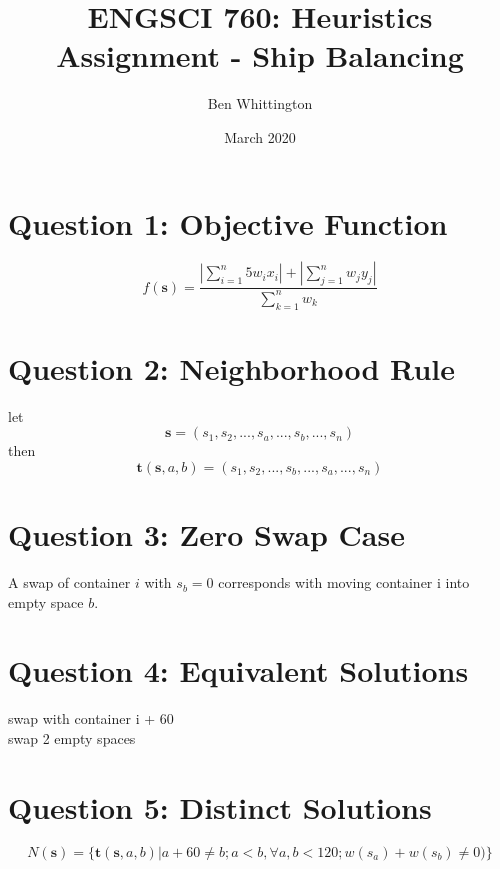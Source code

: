 \documentclass{article}
\title{ENGSCI 760: Heuristics Assignment - Ship Balancing}
\author{Ben Whittington}
\date{March 2020}
\begin{document}
	\maketitle
	\section*{Question 1: Objective Function}
	$$f(\textbf{s}) = \frac{|\sum_{i=1}^{n}5w_i x_i|+|\sum_{j=1}^{n}w_jy_j|}{\sum_{k=1}^{n}w_k}$$
	
	\section*{Question 2: Neighborhood Rule}
	let
	$$\mathbf{s} = (s_1,s_2,...,s_a,...,s_b,...,s_n)$$
	then
	$$\mathbf{t}(\mathbf{s},a,b) = (s_1,s_2,...,s_b,...,s_a,...,s_n)$$
	
	\section*{Question 3:  Zero Swap Case}
	A swap of container $i$ with $s_b=0$ corresponds with moving container i into empty space $b$.
	
	\section*{Question 4: Equivalent Solutions}
	swap with container i + 60\\
	swap 2 empty spaces
	\section*{Question 5: Distinct Solutions}
	$$N(\mathbf{s})=\{\mathbf{t}(\mathbf{s},a,b)|a+60\ne b;a<b, \forall a,b <120;w(s_a) + w(s_b)\ne 0)\}$$
	
\end{document}
